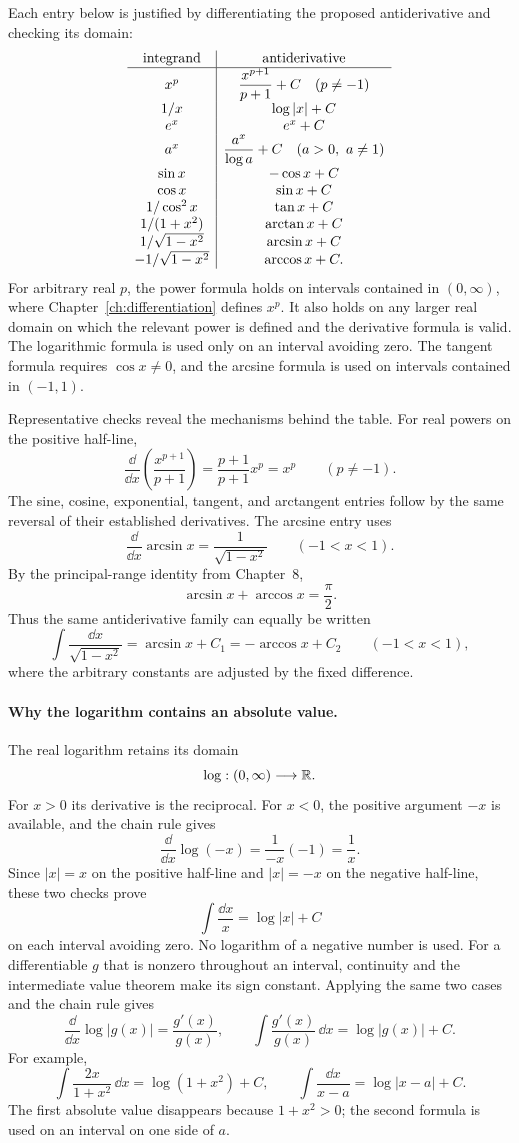 \begin{example}
\label{ex:inverse-trigonometric-antiderivatives}
Each entry below is justified by differentiating the proposed
antiderivative and checking its domain:
\[
\begin{array}{c|c}
\text{integrand}&\text{antiderivative}\cr\hline
x^p&\dfrac{x^{p+1}}{p+1}+C\quad(p\ne-1)\cr
1/x&\log|x|+C\cr
e^x&e^x+C\cr
a^x&\dfrac{a^x}{\log a}+C\quad(a>0,\ a\ne1)\cr
\sin x&-\cos x+C\cr
\cos x&\sin x+C\cr
1/\cos^2x&\tan x+C\cr
1/(1+x^2)&\arctan x+C\cr
1/\sqrt{1-x^2}&\arcsin x+C\cr
-1/\sqrt{1-x^2}&\arccos x+C.
\end{array}
\]
For arbitrary real \(p\), the power formula holds on intervals contained in
\((0,\infty)\), where Chapter~\ref{ch:differentiation} defines \(x^p\).
It also holds on any larger real domain on which the relevant power is
defined and the derivative formula is valid. The logarithmic formula is
used only on an interval avoiding zero. The tangent formula requires
\(\cos x\ne0\), and the arcsine formula is used on intervals contained in
\((-1,1)\).

Representative checks reveal the mechanisms behind the table. For real
powers on the positive half-line,
\[
\frac{\dd}{\dd x}\left(\frac{x^{p+1}}{p+1}\right)
=\frac{p+1}{p+1}x^p=x^p\qquad(p\ne-1).
\]
The sine, cosine, exponential, tangent, and arctangent entries follow by
the same reversal of their established derivatives. The arcsine entry uses
\[
\frac{\dd}{\dd x}\arcsin x=\frac1{\sqrt{1-x^2}}\qquad(-1<x<1).
\]
By the principal-range identity from Chapter~8,
\[
\arcsin x+\arccos x=\frac\pi2.
\]
Thus the same antiderivative family can equally be written
\[
\int\frac{\dd x}{\sqrt{1-x^2}}
=\arcsin x+C_1=-\arccos x+C_2\qquad(-1<x<1),
\]
where the arbitrary constants are adjusted by the fixed difference.

\paragraph{Why the logarithm contains an absolute value.}
The real logarithm retains its domain
\[
\log:(0,\infty)\longrightarrow\mathbb{R}.
\]
For $x>0$ its derivative is the reciprocal. For $x<0$, the positive
argument $-x$ is available, and the chain rule gives
\[
\frac{\dd}{\dd x}\log(-x)=\frac1{-x}(-1)=\frac1x.
\]
Since $|x|=x$ on the positive half-line and $|x|=-x$ on the negative
half-line, these two checks prove
\[
\int\frac{\dd x}{x}=\log|x|+C
\]
on each interval avoiding zero. No logarithm of a negative number is used.
For a differentiable $g$ that is nonzero throughout an interval, continuity
and the intermediate value theorem make its sign constant. Applying the
same two cases and the chain rule gives
\[
\frac{\dd}{\dd x}\log|g(x)|=\frac{g'(x)}{g(x)},
\qquad \int\frac{g'(x)}{g(x)}\,\dd x=\log|g(x)|+C.
\]
For example,
\[
\int\frac{2x}{1+x^2}\,\dd x=\log(1+x^2)+C,
\qquad \int\frac{\dd x}{x-a}=\log|x-a|+C.
\]
The first absolute value disappears because $1+x^2>0$; the second formula
is used on an interval on one side of $a$.


\end{example}
